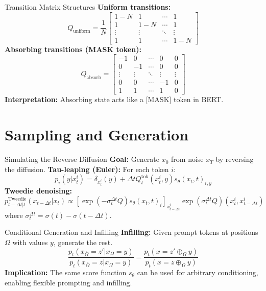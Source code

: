 \documentclass{beamer}
\begin{document}
\begin{frame}{Transition Matrix Structures}
  \textbf{Uniform transitions:}
  \[
    Q_{\text{uniform}} = \frac{1}{N}
    \begin{bmatrix}
      1-N & 1 & \cdots & 1 \\
      1 & 1-N & \cdots & 1 \\
      \vdots & \vdots & \ddots & \vdots \\
      1 & 1 & \cdots & 1-N
    \end{bmatrix}
  \]
  \textbf{Absorbing transitions (MASK token):}
  \[
    Q_{\text{absorb}} =
    \begin{bmatrix}
      -1 & 0 & \cdots & 0 & 0 \\
      0 & -1 & \cdots & 0 & 0 \\
      \vdots & \vdots & \ddots & \vdots & \vdots \\
      0 & 0 & \cdots & -1 & 0 \\
      1 & 1 & \cdots & 1 & 0
    \end{bmatrix}
  \]
  \textbf{Interpretation:} Absorbing state acts like a [MASK] token in BERT.
\end{frame}

\section{Sampling and Generation}

\begin{frame}{Simulating the Reverse Diffusion}
  \textbf{Goal:} Generate $x_0$ from noise $x_T$ by reversing the diffusion.
  \vspace{1em}
  \textbf{Tau-leaping (Euler):} For each token $i$:
  \[
    p_i(y|x^i_t) = \delta_{x^i_t}(y) + \Delta t Q^{\text{tok}}_t(x^i_t, y) s_\theta(x_t, t)_{i, y}
  \]
  \textbf{Tweedie denoising:}
  \[
    p^{\text{Tweedie}}_{t-\Delta t|t}(x_{t-\Delta t}|x_t) \propto [\exp(-\sigma^{\Delta t}_t Q) s_\theta(x_t, t)_i]_{x^i_{t-\Delta t}} \exp(\sigma^{\Delta t}_t Q)(x^i_t, x^i_{t-\Delta t})
  \]
  where $\sigma^{\Delta t}_t = \sigma(t) - \sigma(t - \Delta t)$.
\end{frame}

\begin{frame}{Conditional Generation and Infilling}
  \textbf{Infilling:} Given prompt tokens at positions $\Omega$ with values $y$, generate the rest.
  \[
    \frac{p_t(x_{\bar{\Omega}} = z' | x_\Omega = y)}{p_t(x_{\bar{\Omega}} = z | x_\Omega = y)} = \frac{p_t(x = z' \oplus_\Omega y)}{p_t(x = z \oplus_\Omega y)}
  \]
  \textbf{Implication:} The same score function $s_\theta$ can be used for arbitrary conditioning, enabling flexible prompting and infilling.
\end{frame}
\end{document}
